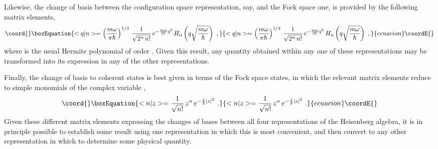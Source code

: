 \documentclass[a4paper,11pt]{article}
\begin{document}
Likewise, the change of basis between the configuration space
representation, say, and the Fock space one, is provided by the
following matrix elements,
\begin{equation}\coord{}\boxEquation{
<q|n>=\left(\frac{m\omega}{\pi\hbar}\right)^{1/4}\,\frac{1}{\sqrt{2^n\,n!}}\,
e^{-\frac{m\omega}{2\hbar}q^2}\,H_n\left(q\sqrt{\frac{m\omega}{\hbar}}\right)\ ,
}{
<q|n>=\left(\frac{m\omega}{\pi\hbar}\right)^{1/4}\,\frac{1}{\sqrt{2^n\,n!}}\,
e^{-\frac{m\omega}{2\hbar}q^2}\,H_n\left(q\sqrt{\frac{m\omega}{\hbar}}\right)\ ,
}{ecuacion}\coordE{}\end{equation}
where \coordHE{} is the usual Hermite polynomial of order \coordHE{}. Given this
result, any quantity obtained within any one of these representations may be
transformed into its expression in any of the other representations.

Finally, the change of basis to coherent states is best given in terms
of the Fock space states, in which the relevant matrix elements reduce
to simple monomials of the complex variable \coordHE{},
\begin{equation}\coord{}\boxEquation{
<n|z>=\frac{1}{\sqrt{n!}}\,z^n\,e^{-\frac{1}{2}|z|^2}\ .
}{
<n|z>=\frac{1}{\sqrt{n!}}\,z^n\,e^{-\frac{1}{2}|z|^2}\ .
}{ecuacion}\coordE{}\end{equation}
Given these different matrix elements expressing the changes of bases
between all four representations of the Heisenberg algebra, it is in
principle possible to establish some result using one representation
in which this is most convenient, and then convert to any other
representation in which to determine some physical quantity.

\vspace{10pt}
\end{document}
